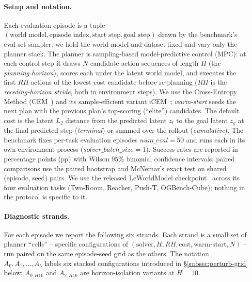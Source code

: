 \documentclass{article}
\begin{document}
\paragraph{Setup and notation.}
Each evaluation episode is a tuple $(\text{world model}, \text{episode index}, \text{start step}, \text{goal step})$ drawn by the benchmark's eval-set sampler; we hold the world model and dataset fixed and vary only the planner stack. The planner is sampling-based model-predictive control (MPC): at each control step it draws $N$ candidate action sequences of length $H$ (the \emph{planning horizon}), scores each under the latent world model, and executes the first $RH$ actions of the lowest-cost candidate before re-planning ($RH$ is the \emph{receding-horizon stride}, both in environment steps). We use the Cross-Entropy Method (CEM~\cite{rubinstein2004crossentropy}) and its sample-efficient variant iCEM~\cite{pinneri2020icem}; \emph{warm-start} seeds the next plan with the previous plan's top-scoring (``elite'') candidates. The default cost is the latent $L_2$ distance from the predicted latent $z_t$ to the goal latent $z_g$ at the final predicted step (\emph{terminal}) or summed over the rollout (\emph{cumulative}). The benchmark fixes per-task evaluation episodes $\mathit{num\_eval}=50$ and runs each in its own environment process ($\mathit{solver\_batch\_size}=1$). Success rates are reported in percentage points (pp) with Wilson $95\%$ binomial confidence intervals; paired comparisons use the paired bootstrap and McNemar's exact test on shared (episode, seed) pairs. We use the released LeWorldModel checkpoint~\cite{maes2026leworldmodel} across its four evaluation tasks (Two-Room, Reacher, Push-T, OGBench-Cube); nothing in the protocol is specific to it.

\paragraph{Diagnostic strands.}
For each episode we report the following six strands. Each strand is a small set of planner ``cells'' -- specific configurations of $(\text{solver}, H, RH, \text{cost}, \text{warm-start}, N)$ -- run paired on the same episode-seed grid as the others. The notation $A_0, A_1, \dots, A_5$ labels six stacked configurations introduced in \S\ref{subsec:perturb-grid} below; $A_{0,H10}$ and $A_{2,H10}$ are horizon-isolation variants at $H{=}10$.
\end{document}
